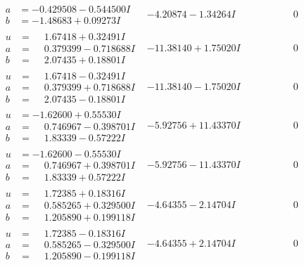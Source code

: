 \documentclass[1p]{elsarticle_modified}
\theoremstyle{definition}
\begin{document}
$$\begin{array}{c|c|c}
\begin{aligned}
a &= -0.429508 - 0.544500 I \\
b &= -1.48683 + 0.09273 I\end{aligned}
 & -4.20874 - 1.34264 I & \phantom{-0.000000 } 0 \\ \hline\begin{aligned}
u &= \phantom{-}1.67418 + 0.32491 I \\
a &= \phantom{-}0.379399 - 0.718688 I \\
b &= \phantom{-}2.07435 + 0.18801 I\end{aligned}
 & -11.38140 + 1.75020 I & \phantom{-0.000000 } 0 \\ \hline\begin{aligned}
u &= \phantom{-}1.67418 - 0.32491 I \\
a &= \phantom{-}0.379399 + 0.718688 I \\
b &= \phantom{-}2.07435 - 0.18801 I\end{aligned}
 & -11.38140 - 1.75020 I & \phantom{-0.000000 } 0 \\ \hline\begin{aligned}
u &= -1.62600 + 0.55530 I \\
a &= \phantom{-}0.746967 - 0.398701 I \\
b &= \phantom{-}1.83339 - 0.57222 I\end{aligned}
 & -5.92756 + 11.43370 I & \phantom{-0.000000 } 0 \\ \hline\begin{aligned}
u &= -1.62600 - 0.55530 I \\
a &= \phantom{-}0.746967 + 0.398701 I \\
b &= \phantom{-}1.83339 + 0.57222 I\end{aligned}
 & -5.92756 - 11.43370 I & \phantom{-0.000000 } 0 \\ \hline\begin{aligned}
u &= \phantom{-}1.72385 + 0.18316 I \\
a &= \phantom{-}0.585265 + 0.329500 I \\
b &= \phantom{-}1.205890 + 0.199118 I\end{aligned}
 & -4.64355 - 2.14704 I & \phantom{-0.000000 } 0 \\ \hline\begin{aligned}
u &= \phantom{-}1.72385 - 0.18316 I \\
a &= \phantom{-}0.585265 - 0.329500 I \\
b &= \phantom{-}1.205890 - 0.199118 I\end{aligned}
 & -4.64355 + 2.14704 I & \phantom{-0.000000 } 0 \\ \hline\begin{aligned}

\end{aligned}
\end{array}$$
\end{document}
